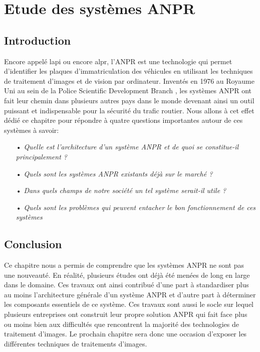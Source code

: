 \chapter{\textbf{Etude des systèmes ANPR}}
    \section{Introduction}
    Encore appelé \acrfull{lapi} ou encore \acrfull{alpr}, l’ANPR est une technologie qui permet d’identifier les plaques d’immatriculation des véhicules en utilisant les techniques de traitement d’images et de vision par ordinateur. Inventés en 1976 au Royaume Uni au sein de la Police Scientific Development Branch \cite{wikianpr}, les systèmes ANPR ont fait leur chemin dans plusieurs autres pays dans le monde devenant ainsi un outil puissant et indispensable pour la sécurité du trafic routier. Nous allons à cet effet dédié ce chapitre pour répondre à quatre questions importantes autour de ces systèmes à savoir:
        \begin{itemize}
            \item[•] \textit{Quelle est l’architecture d’un système ANPR et de quoi se constitue-il principalement ?}
            \item[•] \textit{Quels sont les systèmes ANPR existants déjà sur le marché ?}
            \item[•] \textit{Dans quels champs de notre société un tel système serait-il utile ?}
            \item[•] \textit{Quels sont les problèmes qui peuvent entacher le bon fonctionnement de ces systèmes}
        \end{itemize}

    
    
    

    \section{Conclusion}
    Ce chapitre nous a permis de comprendre que les systèmes ANPR ne sont pas une nouveauté. En réalité, plusieurs études ont déjà été menées de long en large dans le domaine. Ces travaux ont ainsi contribué d’une part à standardiser plus au moins l’architecture générale d’un système ANPR et d’autre part à déterminer les composants essentiels de ce système. Ces travaux sont aussi le socle sur lequel plusieurs entreprises ont construit leur propre solution ANPR qui fait face plus ou moins bien aux difficultés que rencontrent la majorité des technologies de traitement d’images. Le prochain chapitre sera donc une occasion d'exposer les différentes techniques de traitements d'images.